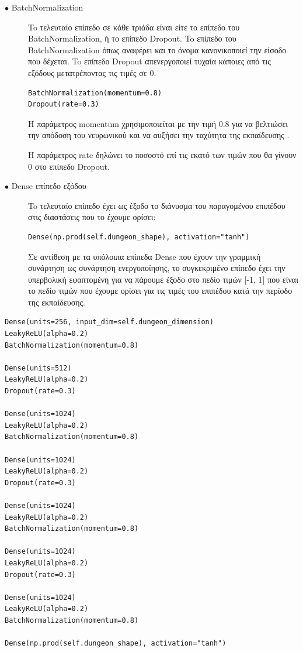 \begin{description}
\item[$\bullet$ BatchNormalization] To τελευταίο επίπεδο σε κάθε τριάδα είναι είτε το επίπεδο του BatchNormalization, ή το επίπεδο Dropout. To επίπεδο του BatchNormalization όπως αναφέρει και το όνομα κανονικοποιεί την είσοδο που δέχεται. To επίπεδο Dropout απενεργοποιεί τυχαία κάποιες από τις εξόδους μετατρέποντας τις τιμές σε 0.
\par
\begin{verbatim}
BatchNormalization(momentum=0.8)
Dropout(rate=0.3)
\end{verbatim}
\par
Η παράμετρος momentum χρησιμοποιείται με την τιμή 0.8 για να βελτιώσει την απόδοση του νευρωνικού και να αυξήσει την ταχύτητα της εκπαίδευσης \cite{firstgan}. 
\par
H παράμετρος rate δηλώνει το ποσοστό επί τις εκατό των τιμών που θα γίνουν 0 στο επίπεδο Dropout.
\end{description}

\begin{description}
\item[$\bullet$ Dense επίπεδο εξόδου] To τελευταίο επίπεδο έχει ως έξοδο το διάνυσμα του παραγομένου επιπέδου στις διαστάσεις που το έχουμε ορίσει:
\par
\begin{verbatim}
Dense(np.prod(self.dungeon_shape), activation="tanh")
\end{verbatim}
\par
Σε αντίθεση με τα υπόλοιπα επίπεδα Dense που έχουν την γραμμική συνάρτηση ως συνάρτηση ενεργοποίησης, το συγκεκριμένο επίπεδο έχει την υπερβολική εφαπτομένη για να πάρουμε έξοδο στο πεδίο τιμών [-1, 1] που είναι το πεδίο τιμών που έχουμε ορίσει για τις τιμές του επιπέδου κατά την περίοδο της εκπαίδευσης.
\end{description}

\begin{verbatim}
Dense(units=256, input_dim=self.dungeon_dimension)
LeakyReLU(alpha=0.2)
BatchNormalization(momentum=0.8)

Dense(units=512)
LeakyReLU(alpha=0.2)
Dropout(rate=0.3)

Dense(units=1024)
LeakyReLU(alpha=0.2)
BatchNormalization(momentum=0.8)

Dense(units=1024)
LeakyReLU(alpha=0.2)
Dropout(rate=0.3)

Dense(units=1024)
LeakyReLU(alpha=0.2)
BatchNormalization(momentum=0.8)

Dense(units=1024)
LeakyReLU(alpha=0.2)
Dropout(rate=0.3)

Dense(units=1024)
LeakyReLU(alpha=0.2)
BatchNormalization(momentum=0.8)

Dense(np.prod(self.dungeon_shape), activation="tanh")
\end{verbatim}


